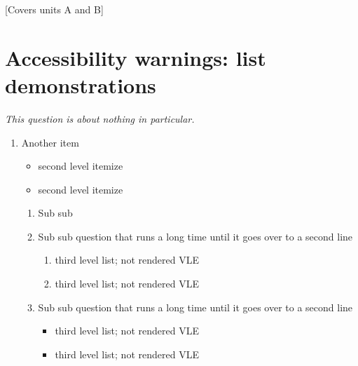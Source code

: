 \documentclass[a-w]{ouab}
\begin{document}
\maketitle

[Covers units A and B]

\section*{Accessibility warnings: list demonstrations}
\emph{This question is about nothing in particular.}
\begin{enumerate}
 \item Another item
       \begin{itemize}
        \item second level itemize
        \item second level itemize
       \end{itemize}
       \begin{enumerate}
        \item Sub sub
        \item Sub sub question that runs a long time until it goes over to a second
              line
              \begin{enumerate}
               \item third level list; not rendered VLE
               \item third level list; not rendered VLE
              \end{enumerate}
        \item Sub sub question that runs a long time until it goes over to a second
              line
              \begin{itemize}
               \item third level list; not rendered VLE
               \item third level list; not rendered VLE
              \end{itemize}
       \end{enumerate}
\end{enumerate}
\end{document}
